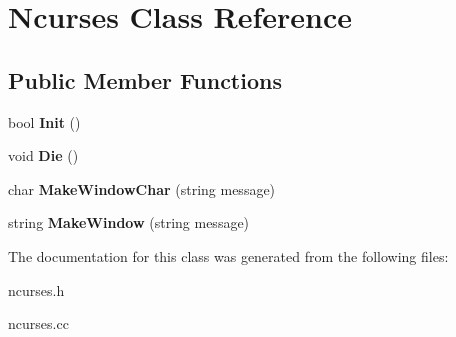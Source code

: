 \hypertarget{classNcurses}{}\section{Ncurses Class Reference}
\label{classNcurses}
\subsection*{Public Member Functions}
\begin{DoxyCompactItemize}
\item 
\mbox{\label{classNcurses_a9966b2b23b522e415232976acfa1d18f}} 
bool {\bfseries Init} ()
\item 
\mbox{\label{classNcurses_af9467a004e66043d4dbe540e24524f1f}} 
void {\bfseries Die} ()
\item 
\mbox{\label{classNcurses_a2b4916627ad802a840b95cf65766773f}} 
char {\bfseries Make\+Window\+Char} (string message)
\item 
\mbox{\label{classNcurses_a1d8def11419a444c5696b5043da680d4}} 
string {\bfseries Make\+Window} (string message)
\end{DoxyCompactItemize}


The documentation for this class was generated from the following files\+:\begin{DoxyCompactItemize}
\item 
ncurses.\+h\item 
ncurses.\+cc\end{DoxyCompactItemize}
